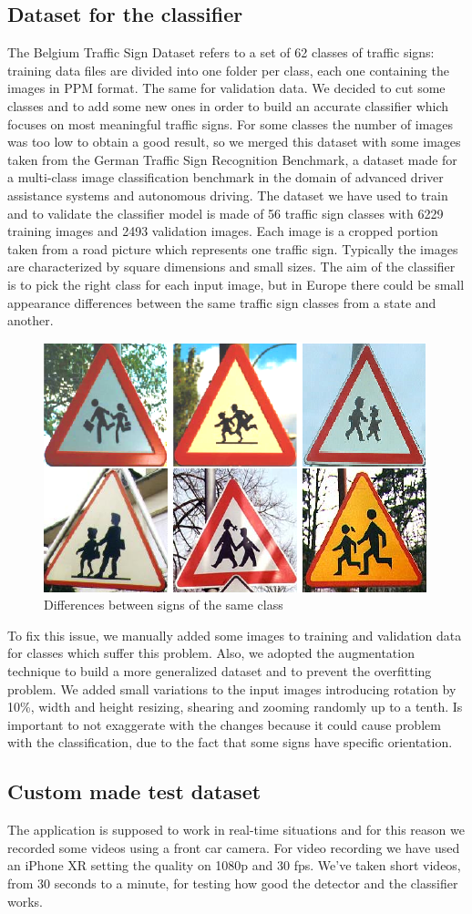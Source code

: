 \subsection{Dataset for the classifier}
The Belgium Traffic Sign Dataset refers to a set of 62 classes of traffic signs: training data files are divided into one folder per class, each one containing the images in PPM format. The same for validation data. We decided to cut some classes and to add some new ones in order to build an accurate classifier which focuses on most meaningful traffic signs. For some classes the number of images was too low to obtain a good result, so we merged this dataset with some images taken from the German Traffic Sign Recognition Benchmark, a dataset made for a multi-class image classification benchmark in the domain of advanced driver assistance systems and autonomous driving. The dataset we have used to train and to validate the classifier model is made of 56 traffic sign classes with 6229 training images and 2493 validation images. Each image is a cropped portion taken from a road picture which represents one traffic sign. Typically the images are characterized by square dimensions and small sizes. 
The aim of the classifier is to pick the right class for each input image, but in Europe there could be small appearance differences between the same traffic sign classes from a state and another.
\begin{figure}{}
	\centering
	\includegraphics[width=0.6\linewidth]{Res/Immagini/differences.png}
	\caption{Differences between signs of the same class}\label{}
\end{figure}
To fix this issue, we manually added some images to training and validation data for classes which suffer this problem. Also, we adopted the augmentation technique to build a more generalized dataset and to prevent the overfitting problem. We added small variations to the input images introducing rotation by 10\%, width and height resizing, shearing and zooming randomly up to a tenth. Is important to not exaggerate with the changes because it could cause problem with the classification, due to the fact that some signs have specific orientation.

\subsection{Custom made test dataset}
The application is supposed to work in real-time situations and for this reason we recorded some videos using a front car camera. For video recording we have used an iPhone XR setting the quality on 1080p and 30 fps. We've taken short videos, from 30 seconds to a minute, for testing how good the detector and the classifier works.